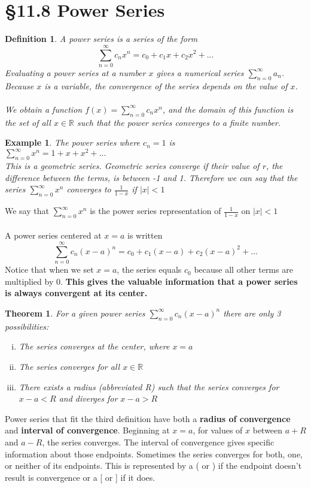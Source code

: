 \documentclass[12 pt]{article}
\newcommand{\sumz}{\sum\limits_{n=0}^{\infty}}
\newcommand{\R}{\mathbb{R}}
\newtheorem*{exmp*}{Example}
\newtheorem*{def*}{Definition}
\newtheorem*{thrm}{Theorem}
\begin{document}
	\section{\S 11.8 Power Series}
		\begin{def*}
			A power series is a series of the form
			$$\sumz c_nx^n=c_0+c_1x+c_2x^2+...$$
			Evaluating a power series at a number $x$ gives a numerical series $\sumz a_n$. Because $x$ is a variable, the convergence of the series depends on the value of $x$.\\\\
			We obtain a function $f(x)=\sumz c_nx^n$, and the domain of this function is the set of all $x\in\R$ such that the power series converges to a finite number.
		\end{def*}
		\begin{exmp*}
			The power series where $c_n=1$ is\\
			$\sumz x^n=1+x+x^2+...$\\
			This is a geometric series. Geometric series converge if their value of $r$, the difference between the terms, is between -1 and 1. Therefore we can say that the series $\sumz x^n$ converges to $\frac{1}{1-x}$ if $\left|x\right|<1$
		\end{exmp*}
		We say that $\sumz x^n$ is the power series representation of $\frac{1}{1-x}$ on $\left|x\right|<1$\\\\
		A power series centered at $x=a$ is written
		$$\sumz c_n(x-a)^n=c_0+c_1(x-a)+c_2(x-a)^2+...$$
		Notice that when we set $x=a$, the series equals $c_0$ because all other terms are multiplied by 0. \textbf{This gives the valuable information that a power series is always convergent at its center.}
		\begin{thrm}
			For a given power series $\sumz c_n(x-a)^n$ there are only 3 possibilities:
			\begin{enumerate}[i)]
				\item The series converges at the center, where $x=a$
				\item The series converges for all $x\in\R$
				\item There exists a radius (abbreviated R) such that the series converges for $x-a<R$ and diverges for $x-a>R$
			\end{enumerate}
		\end{thrm}
		Power series that fit the third definition have both a \textbf{radius of convergence} and \textbf{interval of convergence}. Beginning at $x=a$, for values of $x$ between $a+R$ and $a-R$, the series converges. The interval of convergence gives specific information about those endpoints. Sometimes the series converges for both, one, or neither of its endpoints. This is represented by a ( or ) if the endpoint doesn't result is convergence or a [ or ] if it does.\\\\
\end{document}
